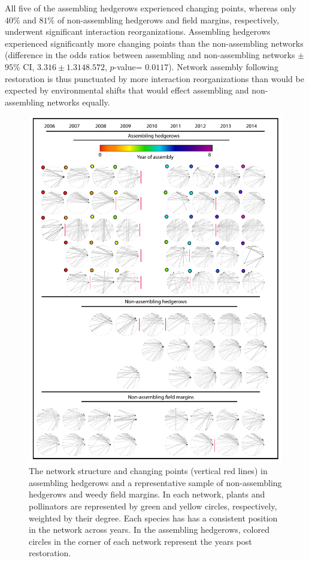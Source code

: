 \documentclass[12pt]{article}
\begin{document}
All five of the assembling hedgerows experienced changing points,
whereas only $40\%$ and $81\%$ of non-assembling hedgerows and field
margins, respectively, underwent significant interaction
reorganizations. Assembling hedgerows experienced significantly more
changing points than the non-assembling networks (difference in the
odds ratios between assembling and non-assembling networks $\pm$
$95\%$ CI, $3.316 \pm 1.314 8.572$, $p$-value= $0.0117$). Network
assembly following restoration is thus punctuated by more interaction
reorganizations than would be expected by environmental shifts that
would effect assembling and non-assembling networks equally.

\begin{figure}
  \centering
  \includegraphics[width=.8\textwidth]{../analysis/changePoint/plotting/networks.pdf}
  \caption{The network structure and changing points (vertical red
    lines) in assembling hedgerows and a representative sample of
    non-assembling hedgerows and weedy field margins. In each network,
    plants and pollinators are represented by green and yellow
    circles, respectively, weighted by their degree. Each species has
    has a consistent position in the network across years. In the
    assembling hedgerows, colored circles in the corner of each
    network represent the years post restoration.}
  \label{fig:changePoints}
\end{figure}
\clearpage
\end{document}
